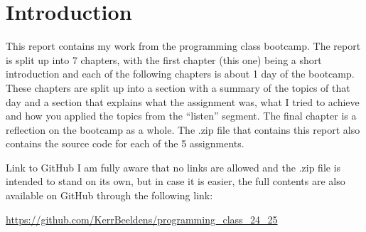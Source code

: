 \chapter{Introduction}
This report contains my work from the programming class bootcamp. The report is split up into 7 chapters, with the first chapter (this one) being a short introduction and each of the following chapters is about 1 day of the bootcamp. These chapters are split up into a section with a summary of the topics of that day and a section that explains what the assignment was, what I tried to achieve and how you applied the topics from the ``listen'' segment. The final chapter is a reflection on the bootcamp as a whole. The .zip file that contains this report also contains the source code for each of the 5 assignments.

\medskip

\begin{hyperlinkbox}{Link to GitHub}
    I am fully aware that no links are allowed and the .zip file is intended to stand on its own, but in case it is easier, the full contents are also available on GitHub through the following link:

    \medskip

    \href{https://github.com/KerrBeeldens/programming_class_24_25}{https://github.com/KerrBeeldens/programming\_class\_24\_25}
\end{hyperlinkbox}
